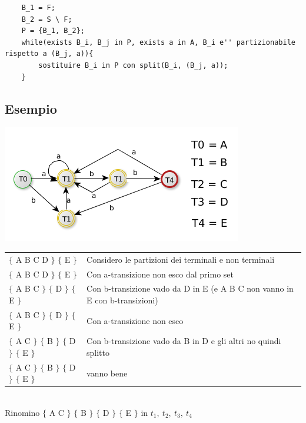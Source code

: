 \begin{lstlisting}
    B_1 = F;
    B_2 = S \ F;
    P = {B_1, B_2};
    while(exists B_i, B_j in P, exists a in A, B_i e'' partizionabile rispetto a (B_j, a)){
        sostituire B_i in P con split(B_i, (B_j, a));
    }
\end{lstlisting}

\subsection{Esempio}

\begin{center}
	\includegraphics[scale=0.5]{Chapters/Img/c02_04.png}\\
\end{center} 

\begin{tabular}{ll}
    $\{$ A B C D $\}$ $\{$ E $\}$                       & Considero le partizioni dei terminali e non terminali \\  
    $\{$ A B C D $\}$ $\{$ E $\}$                       & Con a-transizione non esco dal primo set\\  
    $\{$ A B C $\}$ $\{$ D $\}$ $\{$ E $\}$             & Con b-transizione vado da D in E (e A B C non vanno in E con b-transizioni)\\  
    $\{$ A B C $\}$ $\{$ D $\}$ $\{$ E $\}$             & Con a-transizione non esco\\    
    $\{$ A C $\}$ $\{$ B $\}$ $\{$ D $\}$ $\{$ E $\}$   & Con b-transizione vado da B in D e gli altri no quindi splitto \\
    $\{$ A C $\}$ $\{$ B $\}$ $\{$ D $\}$ $\{$ E $\}$   & vanno bene \\
\end{tabular}\\[5pt]

Rinomino  $\{$ A C $\}$ $\{$ B $\}$ $\{$ D $\}$ $\{$ E $\}$ in $t_1,\ t_2,\ t_3,\ t_4 $

